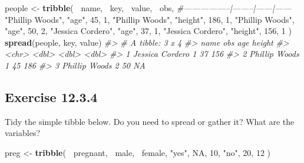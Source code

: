 \documentclass[]{book}
\newenvironment{Shaded}{\begin{snugshade}}{\end{snugshade}}
\newcommand{\CommentTok}[1]{\textcolor[rgb]{0.56,0.35,0.01}{\textit{#1}}}
\newcommand{\DecValTok}[1]{\textcolor[rgb]{0.00,0.00,0.81}{#1}}
\newcommand{\KeywordTok}[1]{\textcolor[rgb]{0.13,0.29,0.53}{\textbf{#1}}}
\newcommand{\NormalTok}[1]{#1}
\newcommand{\OperatorTok}[1]{\textcolor[rgb]{0.81,0.36,0.00}{\textbf{#1}}}
\newcommand{\OtherTok}[1]{\textcolor[rgb]{0.56,0.35,0.01}{#1}}
\newcommand{\StringTok}[1]{\textcolor[rgb]{0.31,0.60,0.02}{#1}}
\theoremstyle{plain}
\theoremstyle{remark}
\begin{document}
\begin{Shaded}
\begin{Highlighting}[]
\NormalTok{people <-}\StringTok{ }\KeywordTok{tribble}\NormalTok{(}
  \OperatorTok{~}\NormalTok{name,             }\OperatorTok{~}\NormalTok{key,    }\OperatorTok{~}\NormalTok{value, }\OperatorTok{~}\NormalTok{obs,}
  \CommentTok{#-----------------|--------|------|------}
  \StringTok{"Phillip Woods"}\NormalTok{,   }\StringTok{"age"}\NormalTok{,       }\DecValTok{45}\NormalTok{, }\DecValTok{1}\NormalTok{,}
  \StringTok{"Phillip Woods"}\NormalTok{,   }\StringTok{"height"}\NormalTok{,   }\DecValTok{186}\NormalTok{, }\DecValTok{1}\NormalTok{,}
  \StringTok{"Phillip Woods"}\NormalTok{,   }\StringTok{"age"}\NormalTok{,       }\DecValTok{50}\NormalTok{, }\DecValTok{2}\NormalTok{,}
  \StringTok{"Jessica Cordero"}\NormalTok{, }\StringTok{"age"}\NormalTok{,       }\DecValTok{37}\NormalTok{, }\DecValTok{1}\NormalTok{,}
  \StringTok{"Jessica Cordero"}\NormalTok{, }\StringTok{"height"}\NormalTok{,   }\DecValTok{156}\NormalTok{, }\DecValTok{1}
\NormalTok{)}
\KeywordTok{spread}\NormalTok{(people, key, value)}
\CommentTok{#> # A tibble: 3 x 4}
\CommentTok{#>   name              obs   age height}
\CommentTok{#>   <chr>           <dbl> <dbl>  <dbl>}
\CommentTok{#> 1 Jessica Cordero     1    37    156}
\CommentTok{#> 2 Phillip Woods       1    45    186}
\CommentTok{#> 3 Phillip Woods       2    50     NA}
\end{Highlighting}
\end{Shaded}

\hypertarget{exercise-12.3.4}{%
\subsection*{\texorpdfstring{Exercise
{12.3.4}}{Exercise 12.3.4}}\label{exercise-12.3.4}}

Tidy the simple tibble below. Do you need to spread or gather it? What
are the variables?

\begin{Shaded}
\begin{Highlighting}[]
\NormalTok{preg <-}\StringTok{ }\KeywordTok{tribble}\NormalTok{(}
  \OperatorTok{~}\NormalTok{pregnant, }\OperatorTok{~}\NormalTok{male, }\OperatorTok{~}\NormalTok{female,}
  \StringTok{"yes"}\NormalTok{,     }\OtherTok{NA}\NormalTok{,    }\DecValTok{10}\NormalTok{,}
  \StringTok{"no"}\NormalTok{,      }\DecValTok{20}\NormalTok{,    }\DecValTok{12}
\NormalTok{)}
\end{Highlighting}
\end{Shaded}
\end{document}
